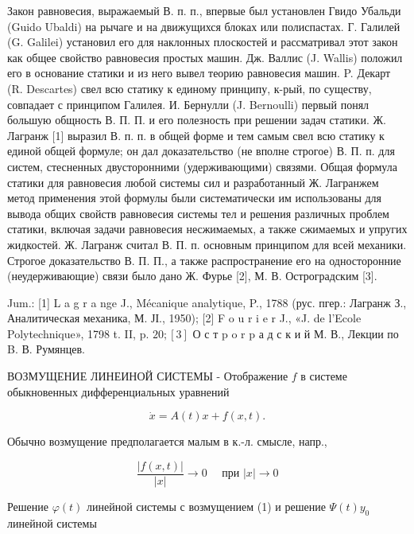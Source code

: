\documentclass[10pt]{article}
\begin{document}
Закон равновесия, выражаемый В. п. п., впервые был установлен Гвидо Убальди (Guido Ubaldi) на рычаге и на движущихся блоках или полиспастах. Г. Галилей (G. Galilei) установил его для наклонных плоскостей и рассматривал этот закон как общее свойство равновесия простых машин. Дж. Валлис (J. Wallis) положил его в основание статики и из него вывел теорию равновесия машин. P. Декарт (R. Descartes) свел всю статику к единому принципу, к-рый, по существу, совпадает с принципом Галилея. И. Бернулли (J. Bernoulli) первый понял большую общность В. П. П. и его полезность при решении задач статики. Ж. Лагранж [1] выразил В. п. п. в общей форме и тем самым свел всю статику к единой общей формуле; он дал доказательство (не вполне строгое) В. П. п. для систем, стесненных двусторонними (удерживающими) связями. Общая формула статики для равновесия любой системы сил и разработанный Ж. Лагранжем метод применения этой формулы были систематически им использованы для вывода общих свойств равновесия системы тел и решения различных проблем статики, включая задачи равновесия несжимаемых, а также сжимаемых и упругих жидкостей. Ж. Лагранж считал В. П. п. основным принципом для всей механики. Строгое доказательство В. П. П., а также распространение его на односторонние (неудерживающие) связи было дано Ж. Фурье [2], М. В. Остроградским [3].



Jum.: [1] L a g r a nge J., Mécanique analytique, P., 1788 (рус. пгер.: Лагранж З., Аналитическая механика, М. ЈІ., 1950); [2] F o u r i e r J., «J. de l'Ecole Polytechnique», 1798 t. II, p. $20 ;[3]$ О с т p o r p а д с к и й М. В., Лекции по B. В. Румянцев.



ВОЗМУЩЕНИЕ ЛИНЕИНОЙ СИСТЕМЫ - Отображение $f$ в системе обыкновенных дифференциальных уравнений



\[

\dot{x}=A(t) x+f(x, t) .

\]



Обычно возмущение предполагается малым в к.-л. смысле, напр.,



\[

\frac{|f(x, t)|}{|x|} \longrightarrow 0 \quad \text { при }|x| \longrightarrow 0

\]



Решение $\varphi(t)$ линейной системы с возмущением (1) и решение $\Psi(t) y_{0}$ линейной системы
\end{document}

